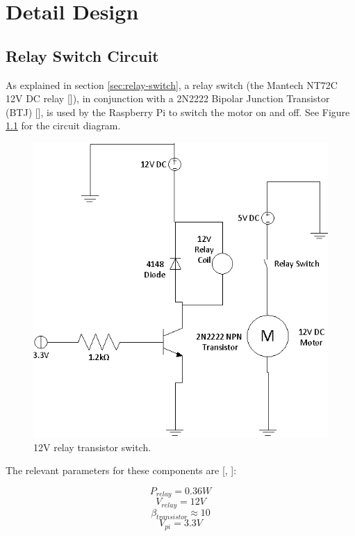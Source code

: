 \chapter{Detail Design}

\section{Relay Switch Circuit}

As explained in section \ref{sec:relay-switch}, a relay switch (the Mantech NT72C 12V DC relay
[\cite{website:relay-specs}]), in conjunction with a 2N2222 Bipolar Junction Transistor (BTJ)
[\cite{website:transistor-datasheet}], is used by the Raspberry Pi to switch the motor on and
off. See Figure \ref{fig:relay-switch} for the circuit diagram.

\begin{figure}[h]
\centering
\includegraphics[scale=0.7]{relay_switch.eps}
\caption{12V relay transistor switch. }
\label{fig:relay-switch}
\end{figure}

The relevant  parameters for these components are [\cite{website:relay-specs},
\cite{website:transistor-datasheet}]:

\[ P_{relay} = 0.36W\]
\[ V_{relay} = 12V\]
\[ \beta_{transistor} \approx 10\]
\[ V_{pi} = 3.3V\]

